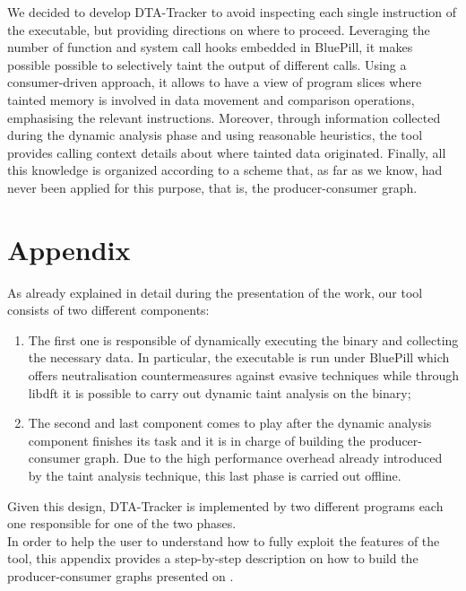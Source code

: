 \documentclass[LaM,binding=0.6cm]{sapthesis}
\begin{document}
We decided to develop DTA-Tracker to avoid inspecting each single instruction of the executable, but providing directions on where to proceed. Leveraging the number of function and system call hooks embedded in BluePill, it makes possible possible to selectively taint the output of different calls. Using a consumer-driven approach, it allows to have a view of program slices where tainted memory is involved in data movement and comparison operations, emphasising the relevant instructions. Moreover, through information collected during the dynamic analysis phase and using reasonable heuristics, the tool provides calling context details about where tainted data originated. Finally, all this knowledge is organized according to a scheme that, as far as we know, had never been applied for this purpose, that is, the producer-consumer graph.

\chapter*{Appendix}
As already explained in detail during the presentation of the work, our tool consists of two different components:
\begin{enumerate}
\item The first one is responsible of dynamically executing the binary and collecting the necessary data. In particular, the executable is run under BluePill which offers neutralisation countermeasures against evasive techniques while through libdft it is possible to carry out dynamic taint analysis on the binary;
\item The second and last component comes to play after the dynamic analysis component finishes its task and it is in charge of building the producer-consumer graph. Due to the high performance overhead already introduced by the taint analysis technique, this last phase is carried out offline.
\end{enumerate}
Given this design, DTA-Tracker is implemented by two different programs each one responsible for one of the two phases.\\

In order to help the user to understand how to fully exploit the features of the tool, this appendix provides a step-by-step description on how to build the producer-consumer graphs presented on .\\
\end{document}
